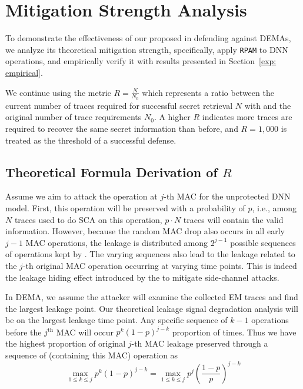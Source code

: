 \section{Mitigation Strength Analysis}\label{sec:theory}




To demonstrate the effectiveness of our proposed \method in defending against DEMAs, we analyze its theoretical mitigation strength, specifically, apply \texttt{RPAM} to DNN operations, and empirically verify it with results presented in Section~\ref{exp: empirical}.

We continue using the metric $R = \frac{N}{N_0}$
which represents a ratio between the current number of traces required for successful secret retrieval $N$ with \method and the original number of trace requirements $N_0$.
A higher $R$ indicates more traces are required to recover the same secret information than before, and $R=1,000$ is treated as the threshold of a successful defense.

\subsection{Theoretical Formula Derivation of $R$} \label{sec: theoretical R}
Assume we aim to attack the operation at $j$-th MAC for the unprotected DNN model. 
First, this operation will be preserved with a probability of $p$, i.e., among $N$ traces used to do SCA on this operation, $p \cdot N$ traces will contain the valid information. 
However, because the random MAC drop also occurs in all early $j-1$ MAC operations, the leakage is distributed among $2^{j-1}$ possible sequences of operations kept by \method. %
The varying sequences also lead to the leakage related to the $j$-th original MAC operation occurring at varying time points.
This is indeed the leakage hiding effect introduced by the \method to mitigate side-channel attacks. 

In DEMA, we assume the attacker will examine the collected EM traces and find the largest leakage point.
Our theoretical leakage signal degradation analysis will be on the largest leakage time point.
Any specific sequence of $k-1$ operations before the $j^{\text{th}}$ MAC will occur $p^k(1-p)^{j-k}$ proportion of times.
Thus we have the highest proportion of original $j$-th MAC leakage preserved through a sequence of (containing this MAC) operation as
$$\max_{1 \le k \le j}p^k(1-p)^{j-k} = \max_{1 \le k \le j} p^j (\frac{1-p}{p})^{j-k} $$

